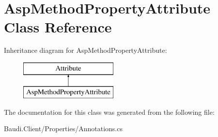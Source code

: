 \hypertarget{class_asp_method_property_attribute}{}\section{Asp\+Method\+Property\+Attribute Class Reference}
\label{class_asp_method_property_attribute}
Inheritance diagram for Asp\+Method\+Property\+Attribute\+:\begin{figure}[H]
\begin{center}
\leavevmode
\includegraphics[height=2.000000cm]{class_asp_method_property_attribute}
\end{center}
\end{figure}


The documentation for this class was generated from the following file\+:\begin{DoxyCompactItemize}
\item 
Baudi.\+Client/\+Properties/Annotations.\+cs\end{DoxyCompactItemize}
